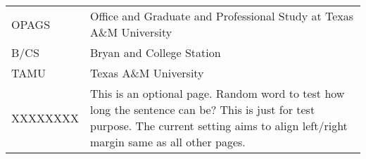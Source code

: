 \TAMUNomenclatureFormat
\begin{flushleft}
	\begin{table}[htbp]
	    \begin{tabular}{p{} p{}}
		OPAGS	&	Office and Graduate and Professional Study at Texas A\&M University\\	[2ex]
		B/CS		&	Bryan and College Station\\	[2ex] %
		TAMU			&	Texas A\&M University\\	[2ex]
		XXXXXXXX		&	This is an optional page. Random word to test how long the sentence can be? This is just for test purpose. The current setting aims to align left/right margin same as all other pages.\\	[2ex]
	    \end{tabular}%
	\end{table}%
\end{flushleft}

